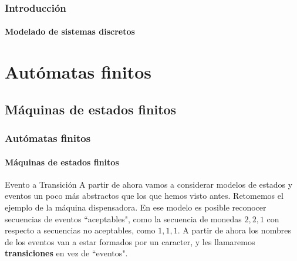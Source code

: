 \documentclass{beamer}
\begin{document}
		\begin{frame}
			\frametitle{Introducci\'on}
			\framesubtitle{Modelado de sistemas discretos}

			\begin{center}
			\end{center}
		\end{frame}

	\section{Aut\'omatas finitos}

        \subsection{M\'aquinas de estados finitos}

        \begin{frame}
			\frametitle{Aut\'omatas finitos}
			\framesubtitle{M\'aquinas de estados finitos}

            \begin{block}{Evento a Transici\'on}
                A partir de ahora vamos a considerar modelos de estados y eventos un poco m\'as abstractos que los que hemos visto antes. Retomemos el ejemplo de la m\'aquina dispensadora. En ese modelo es posible reconocer secuencias de eventos ``aceptables", como la secuencia de monedas $2, 2, 1$ con respecto a secuencias no aceptables, como $1, 1, 1$. A partir de ahora los nombres de los eventos van a estar formados por un caracter, y les llamaremos \textbf{transiciones} en vez de ``eventos".
            \end{block}
		\end{frame}
\end{document}
